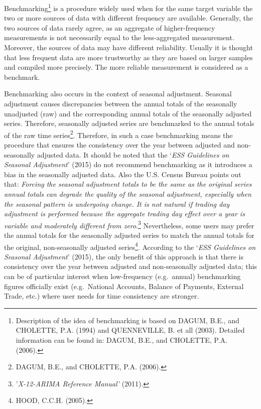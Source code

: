 \documentclass[
  letterpaper,
  DIV=11,
  numbers=noendperiod]{scrreprt}
\begin{document}
Benchmarking\footnote{Description of the idea of benchmarking is based
  on DAGUM, B.E., and CHOLETTE, P.A. (1994) and QUENNEVILLE, B. et all
  (2003). Detailed information can be found in: DAGUM, B.E., and
  CHOLETTE, P.A. (2006).} is a procedure widely used when for the same
target variable the two or more sources of data with different frequency
are available. Generally, the two sources of data rarely agree, as an
aggregate of higher-frequency measurements is not necessarily equal to
the less-aggregated measurement. Moreover, the sources of data may have
different reliability. Usually it is thought that less frequent data are
more trustworthy as they are based on larger samples and compiled more
precisely. The more reliable measurement is considered as a benchmark.

Benchmarking also occurs in the context of seasonal adjustment. Seasonal
adjustment causes discrepancies between the annual totals of the
seasonally unadjusted (raw) and the corresponding annual totals of the
seasonally adjusted series. Therefore, seasonally adjusted series are
benchmarked to the annual totals of the raw time series\footnote{DAGUM,
  B.E., and CHOLETTE, P.A. (2006).}. Therefore, in such a case
benchmarking means the procedure that ensures the consistency over the
year between adjusted and non-seasonally adjusted data. It should be
noted that the `\emph{ESS Guidelines on Seasonal Adjustment}' (2015) do
not recommend benchmarking as it introduces a bias in the seasonally
adjusted data. Also the U.S. Census Bureau points out that:
\emph{Forcing the seasonal adjustment totals to be the same as the
original series annual totals can degrade the quality of the seasonal
adjustment, especially when the seasonal pattern is undergoing change.
It is not natural if trading day adjustment is performed because the
aggregate trading day effect over a year is variable and moderately
different from zero}.\footnote{'\emph{X-12-ARIMA Reference Manual'}
  (2011).} Nevertheless, some users may prefer the annual totals for the
seasonally adjusted series to match the annual totals for the original,
non-seasonally adjusted series\footnote{HOOD, C.C.H. (2005).}. According
to the `\emph{ESS Guidelines on Seasonal Adjustment}' (2015), the only
benefit of this approach is that there is consistency over the year
between adjusted and non-seasonally adjusted data; this can be of
particular interest when low-frequency (e.g.~annual) benchmarking
figures officially exist (e.g.~National Accounts, Balance of Payments,
External Trade, etc.) where user needs for time consistency are
stronger.
\end{document}
